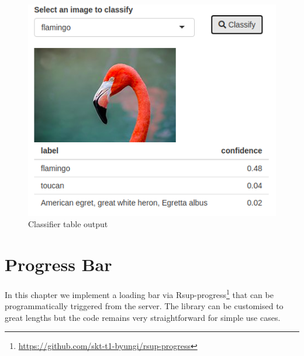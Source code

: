 \documentclass[
]{krantz}
\makeatletter
\newenvironment{Shaded}{\begin{snugshade}}{\end{snugshade}}
\newcommand{\KeywordTok}[1]{\textcolor[rgb]{0.27,0.27,0.27}{\textbf{#1}}}
\newcommand{\NormalTok}[1]{#1}
\newcommand{\OperatorTok}[1]{\textcolor[rgb]{0.43,0.43,0.43}{\textbf{#1}}}
\newcommand{\StringTok}[1]{\textcolor[rgb]{0.5,0.5,0.5}{#1}}
\renewcommand{\href}[2]{#2\footnote{\url{#1}}}
\newenvironment{kframe}{%
\medskip{}
\setlength{\fboxsep}{.8em}
 \def\at@end@of@kframe{}%
 \ifinner\ifhmode%
  \def\at@end@of@kframe{\end{minipage}}%
  \begin{minipage}{\columnwidth}%
 \fi\fi%
 \def\FrameCommand##1{\hskip\@totalleftmargin \hskip-\fboxsep
 \colorbox{shadecolor}{##1}\hskip-\fboxsep
     \hskip-\linewidth \hskip-\@totalleftmargin \hskip\columnwidth}%
 \MakeFramed {\advance\hsize-\width
   \@totalleftmargin\z@ \linewidth\hsize
   \@setminipage}}%
 {\par\unskip\endMakeFramed%
 \at@end@of@kframe}
\renewenvironment{Shaded}{\begin{kframe}}{\end{kframe}}
\makeatother
\begin{document}
\begin{Shaded}
\end{Shaded}

\begin{figure}
\centering
\includegraphics{images/ml5-table.png}
\caption{Classifier table output}
\end{figure}

\hypertarget{progress-bar}{%
\chapter{Progress Bar}\label{progress-bar}}

In this chapter we implement a loading bar via \href{https://github.com/skt-t1-byungi/rsup-progress}{Rsup-progress} that can be programmatically triggered from the server. The library can be customised to great lengths but the code remains very straightforward for simple use cases.
\end{document}
